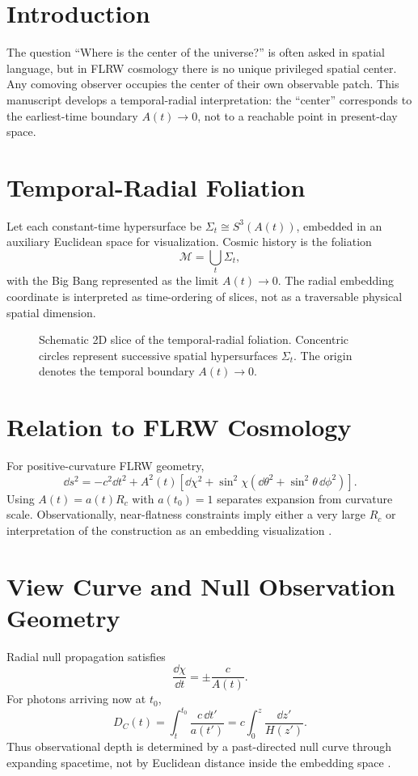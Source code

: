 \section{Introduction}
The question ``Where is the center of the universe?'' is often asked in spatial language, but in FLRW cosmology there is no unique privileged spatial center. Any comoving observer occupies the center of their own observable patch. This manuscript develops a temporal-radial interpretation: the ``center'' corresponds to the earliest-time boundary $A(t)\to 0$, not to a reachable point in present-day space.

\section{Temporal-Radial Foliation}
Let each constant-time hypersurface be $\Sigma_t\cong S^3(A(t))$, embedded in an auxiliary Euclidean space for visualization. Cosmic history is the foliation
\[
\mathcal M = \bigcup_t \Sigma_t,
\]
with the Big Bang represented as the limit $A(t)\to 0$. The radial embedding coordinate is interpreted as time-ordering of slices, not as a traversable physical spatial dimension.

\begin{figure}[htbp]
\centering

\caption{Schematic 2D slice of the temporal-radial foliation. Concentric circles represent successive spatial hypersurfaces $\Sigma_t$. The origin denotes the temporal boundary $A(t)\to 0$.}
\label{fig:foliation}
\end{figure}

\section{Relation to FLRW Cosmology}
For positive-curvature FLRW geometry,
\[
\dd s^2=-c^2\dd t^2 + A^2(t)\left[\dd\chi^2+\sin^2\chi\left(\dd\theta^2+\sin^2\theta\,\dd\phi^2\right)\right].
\]
Using $A(t)=a(t)R_c$ with $a(t_0)=1$ separates expansion from curvature scale. Observationally, near-flatness constraints imply either a very large $R_c$ or interpretation of the construction as an embedding visualization \citep{planck2018vi,tristram2024}.

\section{View Curve and Null Observation Geometry}
Radial null propagation satisfies
\[
\frac{\dd\chi}{\dd t}=\pm\frac{c}{A(t)}.
\]
For photons arriving now at $t_0$,
\[
D_C(t)=\int_t^{t_0}\frac{c\,\dd t'}{a(t')}=c\int_0^z\frac{\dd z'}{H(z')}.
\]
Thus observational depth is determined by a past-directed null curve through expanding spacetime, not by Euclidean distance inside the embedding space \citep{hogg1999}.

